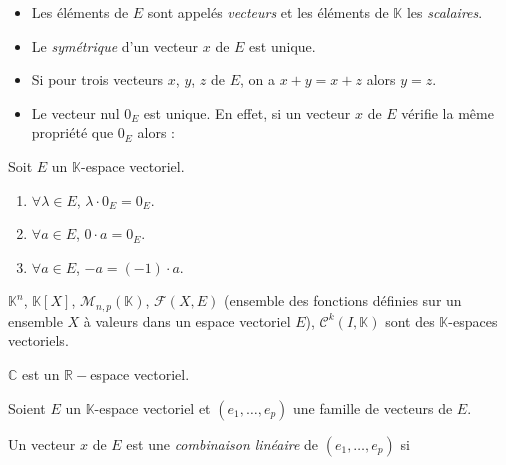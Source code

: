 \documentclass[a4paper,10pt]{report}
\begin{document}
\begin{Remarques}{}
\begin{itemize}
\item Les éléments de $E$ sont appelés \emph{vecteurs} et les éléments de $\mathbb{K}$ les \emph{scalaires}.
\item Le \emph{symétrique} d'un vecteur $x$ de $E$ est unique. 
\item Si pour trois vecteurs $x$, $y$, $z$ de $E$, on a $x+y=x+z$ alors $y=z$. 
\item Le vecteur nul $0_E$ est unique. En effet, si un vecteur $x$ de $E$ vérifie la même propriété que $0_E$ alors :

\vspace{1.5cm}
\end{itemize}
\end{Remarques}{}

\begin{Proposition}{}
Soit $E$ un $\mathbb{K}$-espace vectoriel.

\begin{enumerate}
\item $\forall \lambda \in E$, $\lambda \cdot 0_E= 0_E$.
\item $\forall a \in E$, $0 \cdot a=0_E$.
\item $\forall a \in E$, $-a=(-1) \cdot a$.
\end{enumerate}
\end{Proposition}

\medskip

\begin{exems}
\item $\mathbb{K}^n$, $\mathbb{K}[X]$, $\mathcal{M}_{n,p}(\mathbb{K})$, $\mathcal{F}(X,E)$ (ensemble des fonctions définies sur un ensemble $X$ à valeurs dans un espace vectoriel $E$), $\mathcal{C}^k(I, \mathbb{K})$ sont des $\mathbb{K}$-espaces vectoriels.
\item $\mathbb{C}$ est un $\mathbb{R}-$espace vectoriel.
\end{exems}

\medskip

\begin{Definition}{} Soient $E$ un $\mathbb{K}$-espace vectoriel et $(e_1, \ldots, e_p)$ une famille de vecteurs de $E$.

Un vecteur $x$ de $E$ est une \emph{combinaison linéaire} de $(e_1, \ldots, e_p)$ si 
$$ \phantom{x = \sum_{k=1}^p \lambda_k e_k = \lambda_1 e_1 + \lambda_2 e_2 + \cdots + \lambda_p e_p }$$
\end{Definition}
\end{document}
